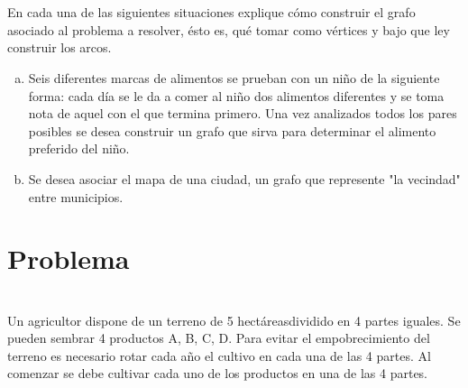 \documentclass[autocontact]{gaceta}
\begin{document}
 


\section{}
    En cada una de las siguientes situaciones explique cómo construir el grafo asociado al
    problema a resolver, ésto es, qué tomar como vértices y bajo que ley construir los 
    arcos.
    \begin{enumerate}[a)]
        \item Seis diferentes marcas de alimentos se prueban con un niño de la siguiente 
            forma: cada día se le da a comer al niño dos alimentos diferentes y se toma nota
            de aquel con el que termina primero. Una vez analizados todos los pares posibles
            se desea construir un grafo que sirva para determinar el alimento preferido del 
            niño.
        \item Se desea asociar el mapa de una ciudad, un grafo que represente "la vecindad"
            entre municipios.
    \end{enumerate}


\section{Problema}


\section{}
        Un agricultor dispone de un terreno de 5 hectáreasdividido en 4 partes iguales. Se 
        pueden sembrar 4 productos A, B, C, D. Para evitar el empobrecimiento del terreno 
        es necesario rotar cada año el cultivo en cada una de las 4 partes. Al comenzar se 
        debe cultivar cada uno de los productos en una de las 4 partes.
\end{document}
